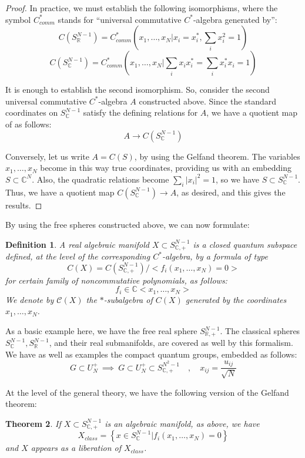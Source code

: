 \documentclass[12pt]{amsbook}
\newtheorem{theorem}{Theorem}[chapter]
\newtheorem{definition}[theorem]{Definition}
\begin{document}
\begin{proof}
In practice, we must establish the following isomorphisms, where the symbol $C^*_{comm}$ stands for ``universal commutative $C^*$-algebra generated by'':
$$C(S^{N-1}_\mathbb R)=C^*_{comm}\left(x_1,\ldots,x_N\Big|x_i=x_i^*,\sum_ix_i^2=1\right)$$
$$C(S^{N-1}_\mathbb C)=C^*_{comm}\left(x_1,\ldots,x_N\Big|\sum_ix_ix_i^*=\sum_ix_i^*x_i=1\right)$$

It is enough to establish the second isomorphism. So, consider the second universal commutative $C^*$-algebra $A$ constructed above. Since the standard coordinates on $S^{N-1}_\mathbb C$ satisfy the defining relations for $A$, we have a quotient map of as follows:
$$A\to C(S^{N-1}_\mathbb C)$$

Conversely, let us write $A=C(S)$, by using the Gelfand theorem. The variables $x_1,\ldots,x_N$ become in this way true coordinates, providing us with an embedding $S\subset\mathbb C^N$. Also, the quadratic relations become $\sum_i|x_i|^2=1$, so we have $S\subset S^{N-1}_\mathbb C$. Thus, we have a quotient map $C(S^{N-1}_\mathbb C)\to A$, as desired, and this gives the results.
\end{proof}

By using the free spheres constructed above, we can now formulate:

\begin{definition}
A real algebraic manifold $X\subset S^{N-1}_{\mathbb C,+}$ is a closed quantum subspace defined, at the level of the corresponding $C^*$-algebra, by a formula of type
$$C(X)=C(S^{N-1}_{\mathbb C,+})\Big/\Big<f_i(x_1,\ldots,x_N)=0\Big>$$
for certain family of noncommutative polynomials, as follows:
$$f_i\in\mathbb C<x_1,\ldots,x_N>$$
We denote by $\mathcal C(X)$ the $*$-subalgebra of $C(X)$ generated by the coordinates $x_1,\ldots,x_N$. 
\end{definition}

As a basic example here, we have the free real sphere $S^{N-1}_{\mathbb R,+}$. The classical spheres $S^{N-1}_\mathbb C,S^{N-1}_\mathbb R$, and their real submanifolds, are covered as well by this formalism. We have as well as examples the compact quantum groups, embedded as follows:
$$G\subset U_N^+\ \implies \ G\subset U_N^+\subset S^{N^2-1}_{\mathbb C,+}\quad,\quad x_{ij}=\frac{u_{ij}}{\sqrt{N}}$$

At the level of the general theory, we have the following version of the Gelfand theorem:

\begin{theorem}
If $X\subset S^{N-1}_{\mathbb C,+}$ is an algebraic manifold, as above, we have
$$X_{class}=\left\{x\in S^{N-1}_\mathbb C\Big|f_i(x_1,\ldots,x_N)=0\right\}$$
and $X$ appears as a liberation of $X_{class}$.
\end{theorem}
\end{document}
